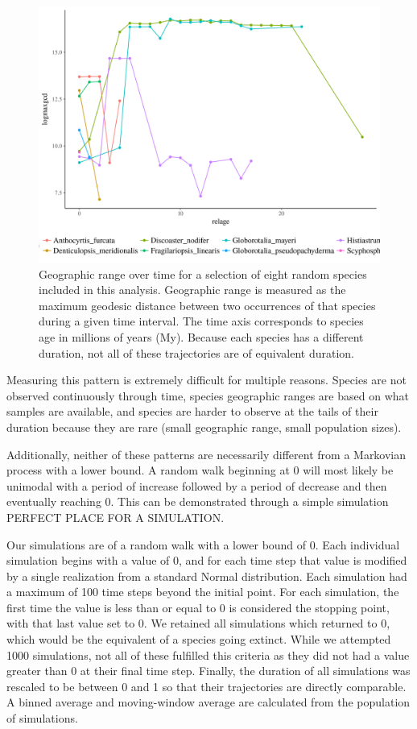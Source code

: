 \documentclass[12pt,letterpaper]{article}
\begin{document}
\begin{figure}[ht]
  \centering
  \includegraphics[width=\textwidth,height=0.5\textheight,keepaspectratio=true]{figure/range_time}
  \caption{Geographic range over time for a selection of eight random species included in this analysis. Geographic range is measured as the maximum geodesic distance between two occurrences of that species during a given time interval. The time axis corresponds to species age in millions of years (My). Because each species has a different duration, not all of these trajectories are of equivalent duration.}
  \label{fig:range_real}
\end{figure}

Measuring this pattern is extremely difficult for multiple reasons. Species are not observed continuously through time, species geographic ranges are based on what samples are available, and species are harder to observe at the tails of their duration because they are rare (small geographic range, small population sizes).

Additionally, neither of these patterns are necessarily different from a Markovian process with a lower bound. A random walk beginning at 0 will most likely be unimodal with a period of increase followed by a period of decrease and then eventually reaching 0. This can be demonstrated through a simple simulation PERFECT PLACE FOR A SIMULATION. 

Our simulations are of a random walk with a lower bound of 0. Each individual simulation begins with a value of 0, and for each time step that value is modified by a single realization from a standard Normal distribution. Each simulation had a maximum of 100 time steps beyond the initial point. For each simulation, the first time the value is less than or equal to 0 is considered the stopping point, with that last value set to 0. We retained all simulations which returned to 0, which would be the equivalent of a species going extinct. While we attempted 1000 simulations, not all of these fulfilled this criteria as they did not had a value greater than 0 at their final time step. Finally, the duration of all simulations was rescaled to be between 0 and 1 so that their trajectories are directly comparable. A binned average and moving-window average are calculated from the population of simulations. 
\end{document}

